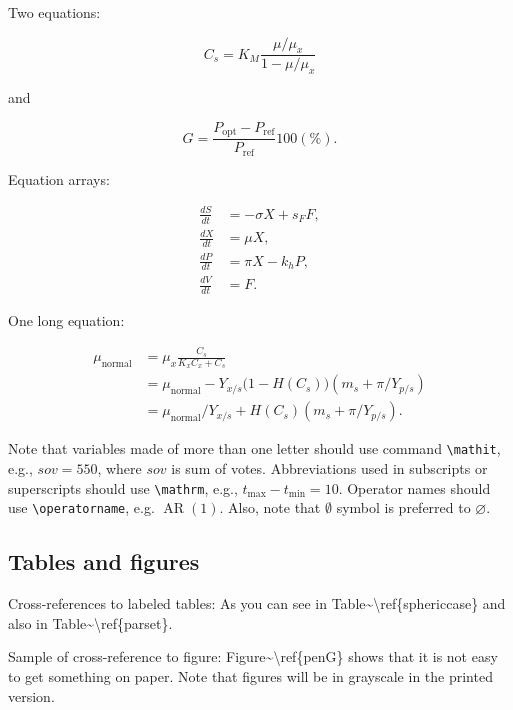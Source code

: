 \documentclass[qe,nameyear,draft]{econsocart}
\theoremstyle{plain}
\theoremstyle{remark}
\begin{document}
Two equations:

\begin{equation}
\label{ccs}
C_{s}  =  K_{M} \frac{\mu/\mu_{x}}{1-\mu/\mu_{x}}
\end{equation}

and

\begin{equation}
G = \frac{P_{\mathrm{opt}} - P_{\mathrm{ref}}}{P_{\mathrm{ref}}}  100(\%).
\end{equation}

Equation arrays:

\begin{align}
  \frac{dS}{dt} & = - \sigma X + s_{F} F,\\
  \frac{dX}{dt} & =   \mu    X,\\
  \frac{dP}{dt} & =   \pi    X - k_{h} P,\\
  \frac{dV}{dt} & =   F.
\end{align}

One long equation:

\begin{align}
 \mu_{\text{normal}} & = \mu_{x} \frac{C_{s}}{K_{x}C_{x}+C_{s}}  \nonumber\\
                     & = \mu_{\text{normal}} - Y_{x/s}\bigl(1-H(C_{s})\bigr)(m_{s}+\pi /Y_{p/s})\nonumber\\
                     & = \mu_{\text{normal}}/Y_{x/s}+ H(C_{s}) (m_{s}+ \pi /Y_{p/s}).
\end{align}

Note that variables made of more than one letter should use command \texttt{{\textbackslash}mathit},
e.g., $\mathit{sov}=550$, where $\mathit{sov}$ is sum of votes. Abbreviations used in subscripts or superscripts should use \texttt{{\textbackslash}mathrm},
e.g., $t_{\mathrm{max}} -t_{\mathrm{min}} =10$. Operator names should use \texttt{{\textbackslash}operatorname}, e.g. $\operatorname{AR}(1)$. Also, note that $\emptyset$ symbol is preferred to $\varnothing$.

\subsection{Tables and figures}

Cross-references to labeled tables: As you can see in Table{\textasciitilde}{\textbackslash}ref\{sphericcase\}
and also in Table{\textasciitilde}{\textbackslash}ref\{parset\}.

Sample of cross-reference to figure: Figure{\textasciitilde}{\textbackslash}ref\{penG\} shows that it is not easy to get something on paper. Note that figures will be in grayscale in the printed version.
\end{document}
